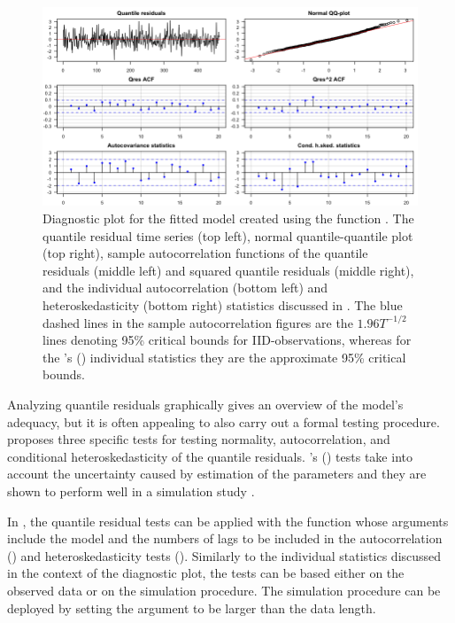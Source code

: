 \documentclass[nojss]{jss} %
\begin{document}
\begin{figure}[t]
  \centering
  \includegraphics{figures/diagplotfit42gs.png}
  \caption{Diagnostic plot for the fitted model  created using the function . The quantile residual time series (top left), normal  quantile-quantile plot (top right), sample autocorrelation functions of the quantile residuals (middle left) and squared quantile residuals (middle right), and the individual autocorrelation (bottom left) and heteroskedasticity (bottom right) statistics discussed in \citet[pp. 369-370]{Kalliovirta:2012}. The blue dashed lines in the sample autocorrelation figures are the $1.96T^{-1/2}$ lines denoting 95\% critical bounds for IID-observations, whereas for the \citeauthor{Kalliovirta:2012}'s (\citeyear{Kalliovirta:2012}) individual statistics they are the approximate 95\% critical bounds.}
\label{fig:diagplotfit42gs}
\end{figure}

Analyzing quantile residuals graphically gives an overview of the model's adequacy, but it is often appealing to also carry out a formal testing procedure. \cite{Kalliovirta:2012} proposes three specific tests for testing normality,  autocorrelation, and conditional heteroskedasticity of the quantile residuals. \citeauthor{Kalliovirta:2012}'s (\citeyear{Kalliovirta:2012}) tests take into account the uncertainty caused by estimation of the parameters and they are shown to perform well in a simulation study \citep[Section 4]{Kalliovirta:2012}.

In , the quantile residual tests can be applied with the function  whose arguments include the model and the numbers of lags to be included in the autocorrelation () and heteroskedasticity tests  (). Similarly to the individual statistics discussed in the context of the diagnostic plot, the tests can be based either on the observed data or on the simulation procedure. The simulation procedure can be deployed by setting the argument  to be larger than the data length.
\end{document}
